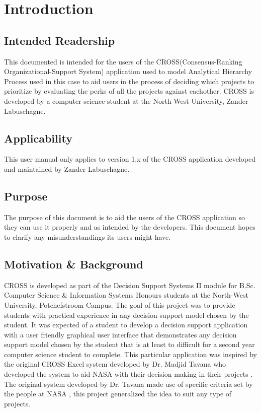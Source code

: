 \documentclass[11pt]{article}
\begin{document}
	

    \renewcommand{\cftsecleader}{\cftdotfill{\cftdotsep}} %
    \tableofcontents
    \thispagestyle{empty}
    \clearpage


    \setcounter{page}{1}

	\section{Introduction}
		\subsection{Intended Readership}
			This documented is intended for the users of the CROSS(Consensus-Ranking Organizational-Support System) application used to model Analytical Hierarchy Process used in this case to aid users in the process of deciding which projects to prioritize by evaluating the perks of all the projects against eachother. CROSS is developed by a computer science student at the North-West University, Zander Labuschagne.

		\subsection{Applicability}
			This user manual only applies to version 1.x of the CROSS application developed and maintained by Zander Labuschagne.

		\subsection{Purpose}
			The purpose of this document is to aid the users of the CROSS application so they can use it properly and as intended by the developers. This document hopes to clarify any misunderstandings its users might have.

		\subsection{Motivation \& Background}
			CROSS is developed as part of the Decision Support Systems II module for B.Sc. Computer Science \& Information Systems Honours students at the North-West University, Potchefstroom Campus. The goal of this project was to provide students with practical experience in any decision support model chosen by the student. It was expected of a student to develop a decision support application with a user friendly graphical user interface that demonstrates any decision support model chosen by the student that is at least to difficult for a second year computer science student to complete. This particular application was inspired by the original CROSS Excel system developed by Dr. Madjid Tavana who developed the system to aid NASA with their decision making in their projects \cite{tavana1996cross}. The original system developed by Dr. Tavana made use of specific criteria set by the people at NASA \cite{tavana2003cross}, this project generalized the idea to suit any type of projects.
\end{document}
